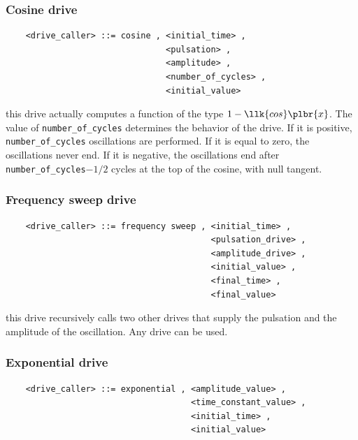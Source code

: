 \documentclass[10pt,dvips]{report}
\begin{document}
\subsubsection{Cosine drive}
\begin{verbatim}
    <drive_caller> ::= cosine , <initial_time> ,
                                <pulsation> ,
                                <amplitude> ,
                                <number_of_cycles> , 
                                <initial_value>
\end{verbatim}
this drive actually computes a function of the type $ 1-\llk{cos}\plbr{x} $.
The value of {\tt number\_of\_cycles} determines the behavior of the
drive. If it is positive, {\tt number\_of\_cycles} oscillations are
performed. If it is equal to zero, the oscillations never end. If it is
negative, the oscillations end after
{\tt number\_of\_cycles}$-1/2$ cycles at the top of the cosine, with null
tangent.   

\subsubsection{Frequency sweep drive}
\begin{verbatim}
    <drive_caller> ::= frequency sweep , <initial_time> ,
                                         <pulsation_drive> ,
                                         <amplitude_drive> ,
                                         <initial_value> ,
                                         <final_time> ,
                                         <final_value>
\end{verbatim}
this drive recursively calls two other drives that supply the pulsation 
and the amplitude of the oscillation. Any drive can be used.

\subsubsection{Exponential drive}
\begin{verbatim}
    <drive_caller> ::= exponential , <amplitude_value> ,
                                     <time_constant_value> ,
                                     <initial_time> ,
                                     <initial_value>
\end{verbatim}
\end{document}
